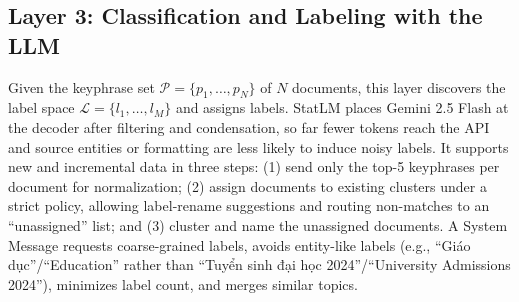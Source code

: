 \subsection{Layer 3: Classification and Labeling with the LLM}
Given the keyphrase set $\mathcal{P}=\{p_1,\dots,p_N\}$ of $N$ documents, this layer discovers the label space $\mathcal{L}=\{l_1,\dots,l_M\}$ and assigns labels. StatLM places Gemini 2.5 Flash at the decoder after filtering and condensation, so far fewer tokens reach the API and source entities or formatting are less likely to induce noisy labels. It supports new and incremental data in three steps: (1) send only the top-5 keyphrases per document for normalization; (2) assign documents to existing clusters under a strict policy, allowing label-rename suggestions and routing non-matches to an ``unassigned'' list; and (3) cluster and name the unassigned documents. A System Message requests coarse-grained labels, avoids entity-like labels (e.g., ``Giáo dục''/``Education'' rather than ``Tuyển sinh đại học 2024''/``University Admissions 2024''), minimizes label count, and merges similar topics.

